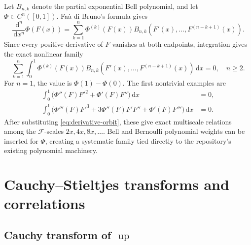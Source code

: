 \documentclass[11pt]{article}
\theoremstyle{definition}
\theoremstyle{remark}
\DeclareMathOperator{\upf}{up}
\newcommand{\dd}{\,\mathrm d}
\newcommand{\FF}{\mathscr F}
\begin{document}
Let \(B_{n,k}\) denote the partial exponential Bell polynomial, and let
\(\Phi\in C^n([0,1])\).  Fa\`a di Bruno's formula gives
\begin{equation}
 \frac{\dd^n}{\dd x^n}\Phi(F(x))
 =\sum_{k=1}^n\Phi^{(k)}(F(x))
 B_{n,k}(F'(x),\ldots,F^{(n-k+1)}(x)).                    \label{eq:Faa-di-Bruno}
\end{equation}
Since every positive derivative of \(F\) vanishes at both endpoints, integration gives
the exact nonlinear family
\begin{equation}
 \boxed{
 \sum_{k=1}^n\int_0^1\Phi^{(k)}(F(x))
 B_{n,k}(F'(x),\ldots,F^{(n-k+1)}(x))\dd x=0,
 \quad n\ge2.
 }                                                        \label{eq:Bell-integrals}
\end{equation}
For \(n=1\), the value is \(\Phi(1)-\Phi(0)\).  The first nontrivial examples are
\begin{align}
 \int_0^1\bigl(\Phi''(F)F'^2+\Phi'(F)F''\bigr)\dd x&=0,  \label{eq:Bell-n2}\\
 \int_0^1\bigl(\Phi'''(F)F'^3+3\Phi''(F)F'F''
   +\Phi'(F)F'''\bigr)\dd x&=0.                           \label{eq:Bell-n3}
\end{align}
After substituting \eqref{eq:derivative-orbit}, these give exact multiscale relations among
the \(\FF\)-scales \(2x,4x,8x,\ldots\).  Bell and Bernoulli
polynomial weights can be inserted for \(\Phi\), creating a systematic family tied
directly to the repository's existing polynomial machinery.

\section{Cauchy--Stieltjes transforms and correlations}

\subsection{Cauchy transform of \(\upf\)}
\end{document}
